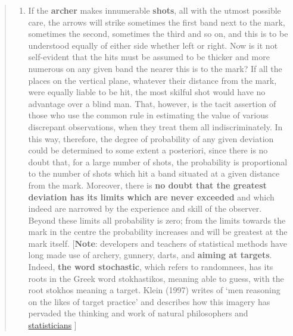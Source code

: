 \documentclass[
]{article}
\providecommand{\tightlist}{%
  \setlength{\itemsep}{0pt}\setlength{\parskip}{0pt}}
\begin{document}
\begin{quote}
\begin{enumerate}
\def\labelenumi{\arabic{enumi}.}
\setcounter{enumi}{4}
\tightlist
\item
  If the \textbf{archer} makes innumerable \textbf{shots}, all with the
  utmost possible care, the arrows will strike sometimes the first band
  next to the mark, sometimes the second, sometimes the third and so on,
  and this is to be understood equally of either side whether left or
  right. Now is it not self-evident that the hits must be assumed to be
  thicker and more numerous on any given band the nearer this is to the
  mark? If all the places on the vertical plane, whatever their distance
  from the mark, were equally liable to be hit, the most skilful shot
  would have no advantage over a blind man. That, however, is the tacit
  assertion of those who use the common rule in estimating the value of
  various discrepant observations, when they treat them all
  indiscriminately. In this way, therefore, the degree of probability of
  any given deviation could be determined to some extent a posteriori,
  since there is no doubt that, for a large number of shots, the
  probability is proportional to the number of shots which hit a band
  situated at a given distance from the mark. Moreover, there is
  \textbf{no doubt that the greatest deviation has its limits which are
  never exceeded} and which indeed are narrowed by the experience and
  skill of the observer. Beyond these limits all probability is zero;
  from the limits towards the mark in the centre the probability
  increases and will be greatest at the mark itself. {[}\textbf{Note}:
  developers and teachers of statistical methods have long made use of
  archery, gunnery, darts, and \textbf{aiming at targets}. Indeed,
  \textbf{the word stochastic}, which refers to randomnees, has its
  roots in the Greek word stokhastikos, meaning able to guess, with the
  root stokhos meaning a target. Klein (1997) writes of `men reasoning
  on the likes of target practice' and describes how this imagery has
  pervaded the thinking and work of natural philosophers and
  \href{http://www.medicine.mcgill.ca/epidemiology/hanley/bios601/Likelihood/letter-jrssa-20110509.pdf}{statisticians}
  {]}
\end{enumerate}
\end{quote}
\end{document}
